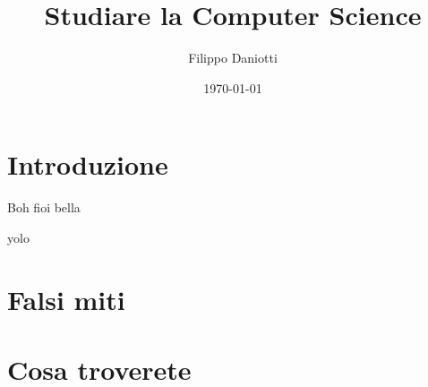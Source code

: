 \documentclass[aspectratio=1610]{beamer}
\title{Studiare la Computer Science}
\author{Filippo Daniotti}
\date{\today}
\begin{document}
	\begin{frame}[plain]
		\addtocounter{framenumber}{-1}
		\titlepage
	\end{frame}

	\section{Introduzione}
		\begin{frame}{Boh fioi bella}
			
		\end{frame}

		\begin{frame}{yolo}
			
		\end{frame}

	\section{Falsi miti}

	\section{Cosa troverete}
\end{document}
